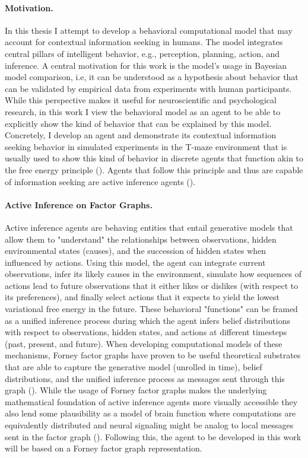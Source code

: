 \paragraph{Motivation.}
In this thesis I attempt to develop a behavioral computational model that may account for contextual information seeking in humans. The model integrates central pillars of intelligent behavior, e.g., perception, planning, action, and inference. A central motivation for this work is the model's usage in Bayesian model comparison, i.e, it can be understood as a hypothesis about behavior that can be validated by empirical data from experiments with human participants. While this perspective makes it useful for neuroscientific and psychological research, in this work I view the behavioral model as an agent to be able to explicitly show the kind of behavior that can be explained by this model. Concretely, I develop an agent and demonstrate its contextual information seeking behavior in simulated experiments in the T-maze environment that is usually used to show this kind of behavior in discrete agents that function akin to the free energy principle (\cite{friston2015}). Agents that follow this principle and thus are capable of information seeking are active inference agents (\cite{friston2010aif}).

\paragraph{Active Inference on Factor Graphs.}
Active inference agents are behaving entities that entail generative models that allow them to "understand" the relationships between observations, hidden environmental states (causes), and the succession of hidden states when influenced by actions. Using this model, the agent can integrate current observations, infer its likely causes in the environment, simulate how sequences of actions lead to future observations that it either likes or dislikes (with respect to its preferences), and finally select actions that it expects to yield the lowest variational free energy in the future. These behavioral "functions" can be framed as a unified inference process during which the agent infers belief distributions with respect to observations, hidden states, and actions at different timesteps (past, present, and future). When developing computational models of these mechanisms, Forney factor graphs have proven to be useful theoretical substrates that are able to capture the generative model (unrolled in time), belief distributions, and the unified inference process as messages sent through this graph (\cite{loeliger2004,delaar2019}). While the usage of Forney factor graphs makes the underlying mathematical foundation of active inference agents more visually accessible they also lend some plausibility as a model of brain function where computations are equivalently distributed and neural signaling might be analog to local messages sent in the factor graph (\cite{bastos2012,friston2017}). Following this, the agent to be developed in this work will be based on a Forney factor graph representation.

